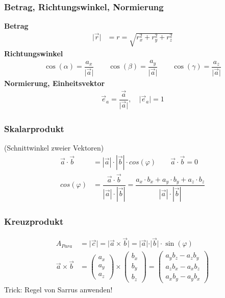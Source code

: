 \subsubsection{Betrag, Richtungswinkel, Normierung}
\textbf{Betrag}
\begin{align*}
	\vert \vec{r}  \vert & = r = \sqrt{r^2_x + r^2_y + r^2_z}
\end{align*}
\textbf{Richtungswinkel}
\begin{align*}
	\cos(\alpha) = \dfrac{a_x}{\vert \vec{a} \vert} \qquad \cos(\beta) = \dfrac{a_y}{\vert \vec{a} \vert} \qquad
	\cos(\gamma) = \dfrac{a_z}{\vert \vec{a} \vert}
\end{align*}
\textbf{Normierung, Einheitsvektor}
\begin{align*}
	\vec{e}_a =  \dfrac{\vec{a}}{\vert \vec{a} \vert}, \quad \vert \vec{e}_a \vert = 1
\end{align*}

\subsubsection{Skalarprodukt} (Schnittwinkel zweier Vektoren)
\begin{align*}
	\vec{a} \cdot \vec{b} & = |\vec{a}| \cdot |\vec{b}| \cdot cos(\varphi) \qquad \vec{a} \cdot \vec{b}  = 0\\
	cos(\varphi)          &  = \dfrac{\vec{a} \cdot \vec{b}}{|\vec{a}| \cdot |\vec{b}|} = \dfrac{a_x \cdot b_x + a_y \cdot b_y + a_z \cdot b_z}{|\vec{a}| \cdot |\vec{b}|}
\end{align*}

\subsubsection{Kreuzprodukt}

\begingroup
\renewcommand*{\arraystretch}{.95}
\begin{align*}
	A_{Para} & = \vert \vec{c} \vert = \vert \vec{a} \times \vec{b} \vert = \vert \vec{a} \vert \cdot \vert \vec{b} \vert \cdot \sin(\varphi)\\
	\vec{a}\times\vec{b} & =
	\begin{pmatrix}
		a_x \\
		a_y \\
		a_z
	\end{pmatrix}
	\times
	\begin{pmatrix}
		b_x \\
		b_y \\
		b_z
	\end{pmatrix} =
	\begin{pmatrix}
		a_yb_z-a_zb_y \\
		a_zb_x-a_xb_z \\
		a_xb_y-a_yb_x
	\end{pmatrix}
\end{align*}
\endgroup
Trick: Regel von Sarrus anwenden!


